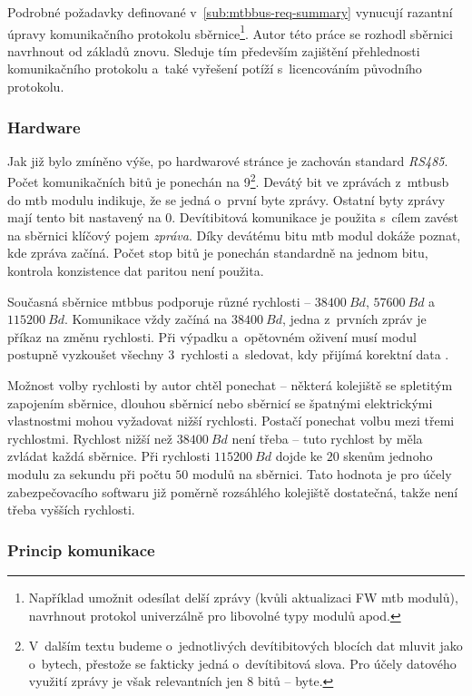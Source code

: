 Podrobné požadavky definované v~\ref{sub:mtbbus-req-summary} vynucují razantní
úpravy komunikačního protokolu sběrnice\footnote{Například umožnit odesílat
delší zprávy (kvůli aktualizaci FW \gls{mtb} modulů), navrhnout protokol
univerzálně pro libovolné typy modulů apod.}. Autor této práce se rozhodl
sběrnici navrhnout od základů znovu. Sleduje tím především zajištění
přehlednosti komunikačního protokolu a~také vyřešení potíží s~licencováním
původního protokolu.

\subsubsection{\textbf{Hardware}}

Jak již bylo zmíněno výše, po hardwarové stránce je zachován standard
\textit{RS485}. Počet komunikačních bitů je ponechán na 9\footnote{
V~dalším textu budeme o~jednotlivých devítibitových blocích dat mluvit jako
o~bytech, přestože se fakticky jedná o~devítibitová slova. Pro účely datového
využití zprávy je však relevantních jen 8 bitů – byte.}.
Devátý bit ve zprávách z~\gls{mtbusb} do \gls{mtb} modulu indikuje, že
se jedná o~první byte zprávy. Ostatní byty zprávy mají tento bit nastavený na
0. Devítibitová komunikace je použita s~cílem zavést na sběrnici klíčový pojem
\textit{zpráva}. Díky devátému bitu \gls{mtb} modul dokáže poznat, kde zpráva
začíná. Počet stop bitů je ponechán standardně na jednom bitu, kontrola
konzistence dat paritou není použita.

Současná sběrnice \gls{mtbbus} podporuje různé rychlosti – $38400~Bd$,
$57600~Bd$ a $115200~Bd$. Komunikace vždy začíná na $38400~Bd$, jedna z~prvních
zpráv je příkaz na změnu rychlosti. Při výpadku a~opětovném oživení musí modul
postupně vyzkoušet všechny 3~rychlosti a~sledovat, kdy přijímá korektní data
\cite{mtbbus-specs}.

Možnost volby rychlosti by autor chtěl ponechat – některá kolejiště se
spletitým zapojením sběrnice, dlouhou sběrnicí nebo sběrnicí se špatnými
elektrickými vlastnostmi mohou vyžadovat nižší rychlosti. Postačí ponechat
volbu mezi třemi rychlostmi.
Rychlost nižší než $38400~Bd$ není třeba – tuto rychlost by měla
zvládat každá sběrnice. Při rychlosti $115200~Bd$ dojde ke $20$ skenům
jednoho modulu za sekundu při počtu $50$ modulů na sběrnici. Tato hodnota je
pro účely zabezpečovacího softwaru již poměrně rozsáhlého kolejiště dostatečná,
takže není třeba vyšších rychlosti.


\subsubsection{\textbf{Princip komunikace}}

